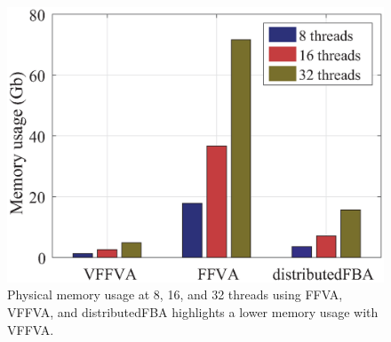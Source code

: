 \documentclass[8pt,a4paper]{book}
\begin{document}
\begin{figure}[!htp]
\centering
\includegraphics[width=\textwidth,height=\textheight,keepaspectratio]{memoryUsage.eps}
\caption[Physical memory usage at 8, 16, and 32 threads.]{Physical memory usage at 8, 16, and 32 threads using FFVA, VFFVA, and distributedFBA highlights a lower memory usage with VFFVA.}
\label{fig:memory.}
\end{figure}
\end{document}
